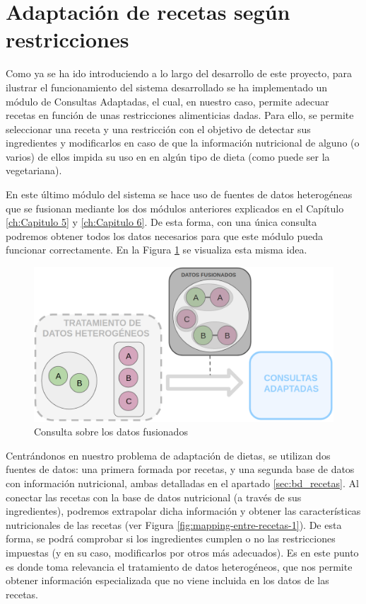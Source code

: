 \section{Adaptación de recetas según restricciones}

Como ya se ha ido introduciendo a lo largo del desarrollo de este proyecto, para ilustrar el funcionamiento del sistema desarrollado se ha implementado un módulo de Consultas Adaptadas, el cual, en nuestro caso, permite adecuar recetas en función de unas restricciones alimenticias dadas. Para ello, se permite seleccionar una receta y una restricción con el objetivo de detectar sus ingredientes y modificarlos en caso de que la información nutricional de alguno (o varios) de ellos impida su uso en en algún tipo de dieta (como puede ser la vegetariana). 

En este último módulo del sistema se hace uso de fuentes de datos heterogéneas que se fusionan mediante los dos módulos anteriores explicados en el Capítulo \ref{ch:Capitulo 5} y \ref{ch:Capitulo 6}. De esta forma, con una única consulta podremos obtener todos los datos necesarios para que este módulo pueda funcionar correctamente. En la Figura \ref{fig:datos-agregados} se visualiza esta misma idea.

\begin{figure}[H]
    \centering
    \includegraphics[width=1.0\textwidth]{imagenes/arquitectura/datos-agregados.png}
    \caption{Consulta sobre los datos fusionados}
    \label{fig:datos-agregados}
\end{figure}


Centrándonos en nuestro problema de adaptación de dietas, se utilizan dos fuentes de datos: una primera formada por recetas, y una segunda base de datos con información nutricional, ambas detalladas en el apartado \ref{sec:bd_recetas}. Al conectar las recetas con la base de datos nutricional (a través de sus ingredientes), podremos extrapolar dicha información y obtener las características nutricionales de las recetas (ver Figura \ref{fig:mapping-entre-recetas-1}). De esta forma, se podrá comprobar si los ingredientes cumplen o no las restricciones impuestas (y en su caso, modificarlos por otros más adecuados). Es en este punto es donde toma relevancia el tratamiento de datos heterogéneos, que nos permite obtener información especializada que no viene incluida en los datos de las recetas. 


